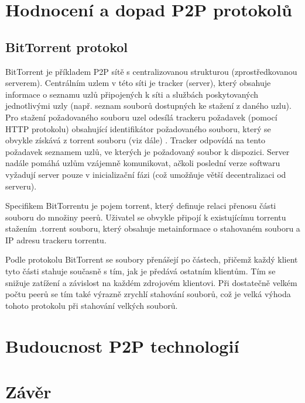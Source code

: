 \documentclass[10pt,twoside,czech,a4paper]{article}
\begin{document}
\section{Hodnocení a dopad P2P protokolů}

\subsection{BitTorrent protokol}

BitTorrent je příkladem P2P sítě s centralizovanou strukturou (zprostředkovanou serverem).
Centrálním uzlem v této síti je tracker (server), který obsahuje informace o seznamu uzlů připojených k síti a službách poskytovaných jednotlivými uzly (např. seznam souborů dostupných ke stažení z daného uzlu).
Pro stažení požadovaného souboru uzel odesílá trackeru požadavek (pomocí HTTP protokolu) obsahující identifikátor požadovaného souboru, který se obvykle získává z torrent souboru (viz dále) \cite{Chokkalingam2004}.
Tracker odpovídá na tento požadavek seznamem uzlů, ve kterých je požadovaný soubor k dispozici\cite{Radchenko2012}.
Server nadále pomáhá uzlům vzájemně komunikovat, ačkoli poslední verze softwaru vyžadují server pouze v inicializační fázi (což umožňuje větší decentralizaci od serveru)\cite{Lande2008}.

Specifikem BitTorrentu je pojem torrent, který definuje relaci přenosu části souboru do množiny peerů.
Uživatel se obvykle připojí k existujícímu torrentu stažením .torrent souboru, který obsahuje metainformace o stahovaném souboru a IP adresu trackeru torrentu\cite{Legout2005, Chokkalingam2004}.

Podle protokolu BitTorrent se soubory přenášejí po částech, přičemž každý klient tyto části stahuje současně s tím, jak je předává ostatním klientům.
Tím se snižuje zatížení a závislost na každém zdrojovém klientovi\cite{Lande2008}.
Při dostatečně velkém počtu peerů se tím také výrazně zrychlí stahování souborů, což je velká výhoda tohoto protokolu při stahování velkých souborů\cite{Barakat2004}.


\section{Budoucnost P2P technologií}


\section{Závěr}



\end{document}
